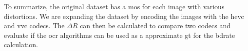 To summarize, the original dataset has a \gls{mos} for each image with various distortions.
We are expanding the dataset by encoding the images with the \gls{hevc} and \gls{vvc} codecs.
The $\Delta R$ can then be calculated to compare two codecs and evaluate if the \gls{ocr} algorithms can be used as a approximate \gls{gt} for the \gls{bdrate} calculation.
